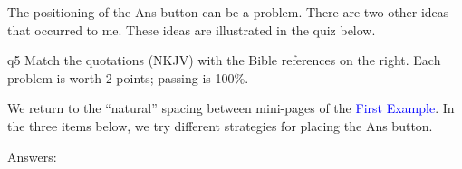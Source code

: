 \documentclass[11pt]{article}
\begin{document}
The positioning of the \textsf{Ans} button can be a problem. There are two other
ideas that occurred to me. These ideas are illustrated in the quiz below.

\begin{quiz*}{q5}
Match the quotations (\textsf{NKJV)} with the Bible references on the right.
Each problem is worth 2 points; passing is 100\%.

We return to the ``natural'' spacing between mini-pages of the
\textcolor{blue}{First Example}. In the three items below, we try different
strategies for placing the \textsf{Ans} button.

\useMCCircles

\noindent
\begin{minipage}[t]{.75\linewidth}
\begin{questions}
\useNumbersOff
\adjCAB{}
\begin{BblPsg}
\priorRBT{\makebox[0pt][r]{#1\hskip\marginparsep}}
  \item{}
\end{BblPsg}
\useNumbersOn
{}
\begin{BblPsg}
  \item{}
\end{BblPsg}
\useNumbersOff
\priorRBT{}
\begin{BblPsg}
  \item{}
\end{BblPsg}
\end{questions}
\end{minipage}
\hfill
\begin{minipage}[t][0pt]{.25\linewidth-1em}
\begin{questions}[itemsep={0pt},labelwidth={.5em}]
\begin{BblVrs}
  \item{}
  \item{}
  \item{}
  \item{}
  \item{}
  \item{}
\end{BblVrs}
\end{questions}
\end{minipage}\hfill
\par\medskip

\end{quiz*}\quad\PointsField\currQuiz\olBdry\CorrButton\currQuiz\cgBdry[6pt]
Answers: 
\end{document}
